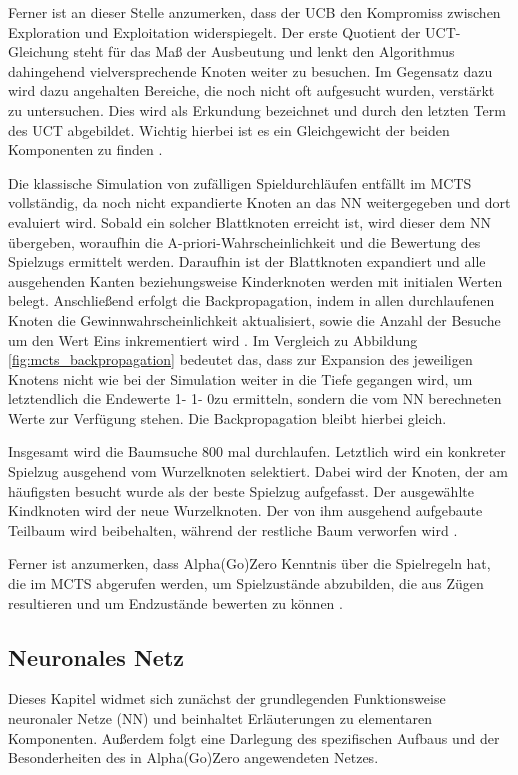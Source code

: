 \documentclass[12pt,a4paper]{article}
\begin{document}
Ferner ist an dieser Stelle anzumerken, dass der UCB den Kompromiss zwischen Exploration und Exploitation widerspiegelt. Der erste Quotient der UCT-Gleichung steht für das Maß der Ausbeutung und lenkt den Algorithmus dahingehend vielversprechende Knoten weiter zu besuchen. Im Gegensatz dazu wird dazu angehalten Bereiche, die noch nicht oft aufgesucht wurden, verstärkt zu untersuchen. Dies wird als Erkundung bezeichnet und durch den letzten Term des UCT abgebildet. Wichtig hierbei ist es ein Gleichgewicht der beiden Komponenten zu finden \cite{Browne2012}.

Die klassische Simulation von zufälligen Spieldurchläufen entfällt im MCTS vollständig, da noch nicht expandierte Knoten an das NN weitergegeben und dort evaluiert wird. Sobald ein solcher Blattknoten erreicht ist, wird dieser dem NN übergeben, woraufhin die A-priori-Wahrscheinlichkeit und die Bewertung des Spielzugs ermittelt werden. Daraufhin ist der Blattknoten expandiert und alle ausgehenden Kanten beziehungsweise Kinderknoten werden mit initialen Werten belegt.
Anschließend erfolgt die Backpropagation, indem in allen durchlaufenen Knoten die Gewinnwahrscheinlichkeit aktualisiert, sowie die Anzahl der Besuche um den Wert Eins inkrementiert wird \cite{Silver2017}. Im Vergleich zu Abbildung \ref{fig:mcts_backpropagation} bedeutet das, dass zur Expansion des jeweiligen Knotens nicht wie bei der Simulation weiter in die Tiefe gegangen wird, um letztendlich die Endewerte \glqq{}1\grqq - \glqq{}1\grqq - \glqq{}0\grqq zu ermitteln, sondern die vom NN berechneten Werte zur Verfügung stehen. Die Backpropagation bleibt hierbei gleich.

Insgesamt wird die Baumsuche 800 mal durchlaufen\cite{SilverHubert2017}. Letztlich wird ein konkreter Spielzug ausgehend vom Wurzelknoten selektiert. Dabei wird der Knoten, der am häufigsten besucht wurde als der beste Spielzug aufgefasst. Der ausgewählte Kindknoten wird der neue Wurzelknoten. Der von ihm ausgehend aufgebaute Teilbaum wird beibehalten, während der restliche Baum verworfen wird \cite{Silver2017}.

Ferner ist anzumerken, dass Alpha(Go)Zero Kenntnis über die Spielregeln hat, die im MCTS abgerufen werden, um Spielzustände abzubilden, die aus Zügen resultieren und um Endzustände bewerten zu können \cite{Silver2017} \cite{SilverHubert2017}. 

\newpage
\subsection{Neuronales Netz}
Dieses Kapitel widmet sich zunächst der grundlegenden Funktionsweise neuronaler Netze (NN) und beinhaltet Erläuterungen zu elementaren Komponenten. Außerdem folgt eine Darlegung des spezifischen Aufbaus und der Besonderheiten des in Alpha(Go)Zero angewendeten Netzes.
\end{document}

